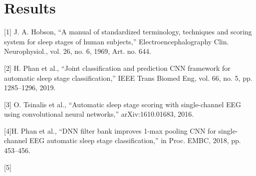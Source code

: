 \documentclass{article}
\begin{document}
\section{Results}


[1] J. A. Hobson, “A manual of standardized terminology, techniques and
scoring system for sleep stages of human subjects,” Electroencephalography Clin. Neurophysiol., vol. 26, no. 6, 1969, Art. no. 644.

[2] H. Phan et al., “Joint classification and prediction CNN framework for
automatic sleep stage classification,” IEEE Trans Biomed Eng, vol. 66,
no. 5, pp. 1285–1296, 2019.

[3] O. Tsinalis et al., “Automatic sleep stage scoring with single-channel
EEG using convolutional neural networks,” arXiv:1610.01683, 2016.

[4]H. Phan et al., “DNN filter bank improves 1-max pooling CNN for
single-channel EEG automatic sleep stage classification,” in Proc.
EMBC, 2018, pp. 453–456.

[5]
\end{document}
